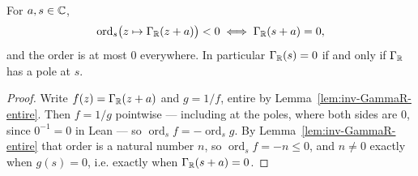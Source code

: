 \begin{theorem}
  \label{thm:GammaR-junk-is-pole}
  \leanok
  For $a, s \in \mathbb{C}$,
  \[ \operatorname{ord}_{s}\bigl(z \mapsto \Gamma_{\mathbb{R}}(z+a)\bigr) < 0
     \iff \Gamma_{\mathbb{R}}(s+a) = 0, \]
  and the order is at most $0$ everywhere. In particular $\Gamma_{\mathbb{R}}(s) = 0$ if and only if
  $\Gamma_{\mathbb{R}}$ has a pole at $s$.
\end{theorem}
\begin{proof}
  \leanok
  Write $f(z) = \Gamma_{\mathbb{R}}(z+a)$ and $g = 1/f$, entire by
  Lemma~\ref{lem:inv-GammaR-entire}. Then $f = 1/g$ pointwise --- including at the poles, where
  both sides are $0$, since $0^{-1} = 0$ in Lean --- so
  $\operatorname{ord}_s f = -\operatorname{ord}_s g$. By Lemma~\ref{lem:inv-GammaR-entire} that
  order is a natural number $n$, so $\operatorname{ord}_s f = -n \leq 0$, and $n \neq 0$ exactly
  when $g(s) = 0$, i.e. exactly when $\Gamma_{\mathbb{R}}(s+a) = 0$.
\end{proof}

